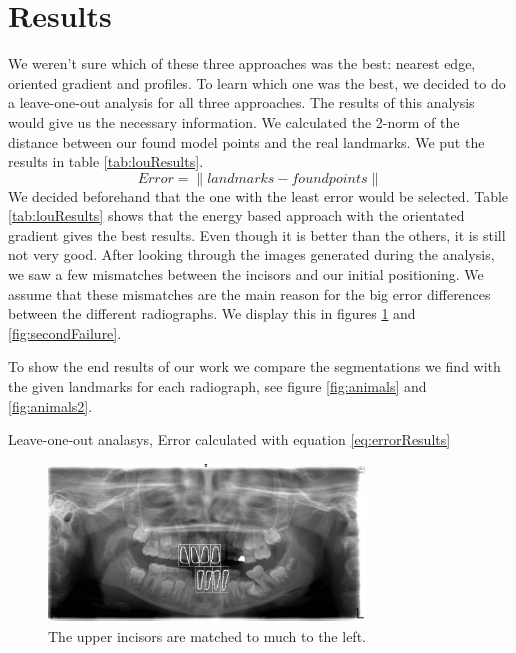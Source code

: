 \documentclass[a4paper,10pt]{article}
\begin{document}
\section{Results}\label{sec:results}

We weren't sure which of these three approaches was the best: nearest edge, oriented gradient and profiles. To learn which one was the best, we decided to do a leave-one-out analysis for all three approaches.  The results of this analysis would give us the necessary information. We calculated the 2-norm of the distance between our found model points and the real landmarks. We put the results in table \ref{tab:louResults}.
\begin{equation} \label{eq:errorResults}
Error = \|landmarks - foundpoints\|
\end{equation}
We decided beforehand that the one with the least error would be selected. Table  \ref{tab:louResults} shows that the energy based approach with the orientated gradient gives the best results. Even though it is better than the others, it is still not very good. After looking through the images generated during the analysis, we saw a few mismatches between the incisors and our initial positioning. We assume that these mismatches are the main reason for the big error differences between the different radiographs. We display this in figures \ref{fig:firstFailure} and \ref{fig:secondFailure}.

To show the end results of our work we compare the segmentations we find with the given landmarks for each radiograph, see figure \ref{fig:animals} and \ref{fig:animals2}.

\begin{table}
\begin{center}
\caption{Leave-one-out analasys, Error calculated with equation \ref{eq:errorResults}} \label{tab:louResults}
\end{center}
\end{table}

\begin{figure}[h!]
  \centering
    \includegraphics[width=0.75\textwidth]{images/firstFailure.jpg}
  \caption{The upper incisors are matched to much to the left.}
  \label{fig:firstFailure}
\end{figure}
\end{document}
